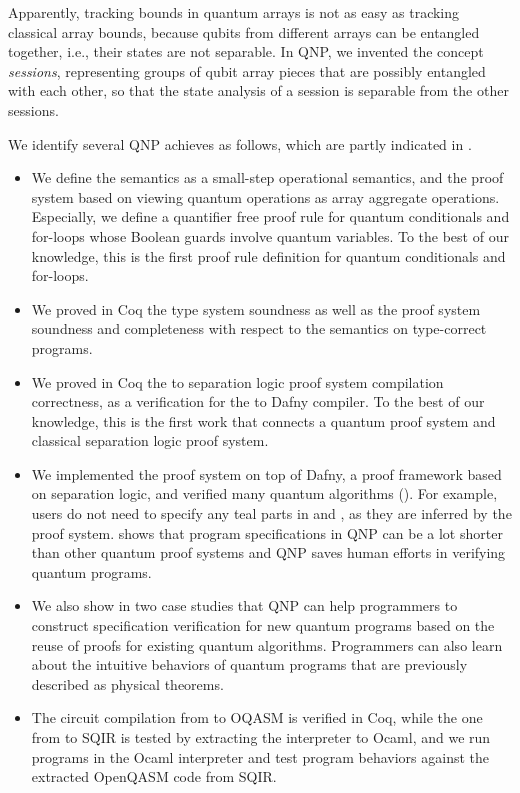 Apparently, tracking bounds in quantum arrays is not as easy as tracking classical array bounds, because qubits from different arrays can be entangled together, i.e., their states are not separable. In QNP, we invented the concept \emph{sessions}, representing groups of qubit array pieces that are possibly entangled with each other, so that the state analysis of a session is separable from the other sessions.

We identify several QNP achieves as follows, which are partly indicated in .


\begin{itemize}

\item We define the \qafny semantics as a small-step operational semantics, and the \qafny proof system based on viewing quantum operations as array aggregate operations. Especially, we define a quantifier free proof rule for quantum conditionals and for-loops whose Boolean guards involve quantum variables. To the best of our knowledge, this is the first proof rule definition for quantum conditionals and for-loops. 

\item We proved in Coq the \qafny type system soundness as well as the proof system soundness and completeness with respect to the \qafny semantics on type-correct programs.

\item We proved in Coq the \qafny to separation logic proof system compilation correctness, as a verification for the \qafny to Dafny compiler. To the best of our knowledge, this is the first work that connects a quantum proof system and classical separation logic proof system.

\item We implemented the \qafny proof system on top of Dafny, a proof framework based on separation logic, and verified many quantum algorithms (). For example, users do not need to specify any teal parts in  and , as they are inferred by the \qafny proof system.  shows that program specifications in QNP can be a lot shorter than other quantum proof systems and QNP saves human efforts in verifying quantum programs.

\item We also show in  two case studies that QNP can help programmers to construct specification verification for new quantum programs based on the reuse of proofs for existing quantum algorithms. Programmers can also learn about the intuitive behaviors of quantum programs that are previously described as physical theorems. 

\item The circuit compilation from \qafny to OQASM is verified in Coq, while the one from \qafny to SQIR is tested by extracting the \qafny interpreter to Ocaml, and we run programs in the Ocaml interpreter and test program behaviors against the extracted OpenQASM code from SQIR.

\end{itemize}






